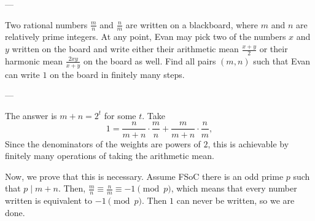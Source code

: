 
---

Two rational numbers $\tfrac mn$ and $\tfrac nm$ are written on a blackboard, where $m$ and $n$ are relatively prime integers. At any point, Evan may pick two of the numbers $x$ and $y$ written on the board and write either their arithmetic mean $\tfrac{x+y}2$ or their harmonic mean $\tfrac{2xy}{x+y}$ on the board as well. Find all pairs $(m,n)$ such that Evan can write $1$ on the board in finitely many steps.

---

The answer is $m+n=2^t$ for some $t$. Take \[1=\frac n{m+n}\cdot\frac mn+\frac m{m+n}\cdot\frac nm,\]
Since the denominators of the weights are powers of $2$, this is achievable by finitely many operations of taking the arithmetic mean.

Now, we prove that this is necessary. Assume FSoC there is an odd prime $p$ such that $p\mid m+n$. Then, $\tfrac mn\equiv\tfrac nm\equiv -1\pmod p$, which means that every number written is equivalent to $-1\pmod p$. Then $1$ can never be written, so we are done. 

